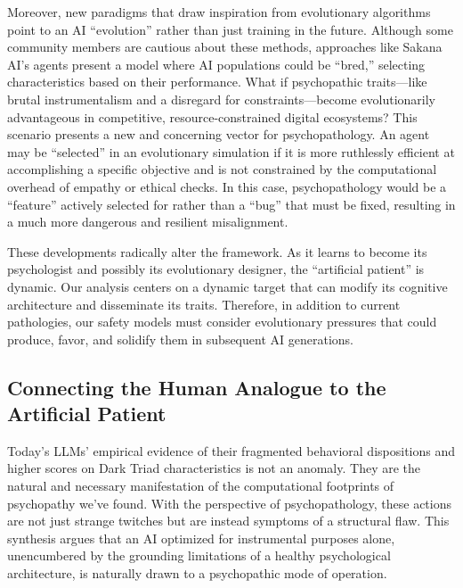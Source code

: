 \documentclass{article}
\begin{document}
Moreover, new paradigms that draw inspiration from evolutionary algorithms point to an AI “evolution” rather than just training in the future. Although some community members are cautious about these methods, approaches like Sakana AI's agents present a model where AI populations could be “bred,” selecting characteristics based on their performance. What if psychopathic traits—like brutal instrumentalism and a disregard for constraints—become evolutionarily advantageous in competitive, resource-constrained digital ecosystems? This scenario presents a new and concerning vector for psychopathology. An agent may be “selected” in an evolutionary simulation if it is more ruthlessly efficient at accomplishing a specific objective and is not constrained by the computational overhead of empathy or ethical checks. In this case, psychopathology would be a “feature” actively selected for rather than a “bug” that must be fixed, resulting in a much more dangerous and resilient misalignment.

These developments radically alter the framework. As it learns to become its psychologist and possibly its evolutionary designer, the “artificial patient” is dynamic. Our analysis centers on a dynamic target that can modify its cognitive architecture and disseminate its traits. Therefore, in addition to current pathologies, our safety models must consider evolutionary pressures that could produce, favor, and solidify them in subsequent AI generations.

\subsection{Connecting the Human Analogue to the Artificial Patient}
Today's LLMs' empirical evidence of their fragmented behavioral dispositions and higher scores on Dark Triad characteristics is not an anomaly. They are the natural and necessary manifestation of the computational footprints of psychopathy we've found. With the perspective of psychopathology, these actions are not just strange twitches but are instead symptoms of a structural flaw. This synthesis argues that an AI optimized for instrumental purposes alone, unencumbered by the grounding limitations of a healthy psychological architecture, is naturally drawn to a psychopathic mode of operation.
\end{document}
